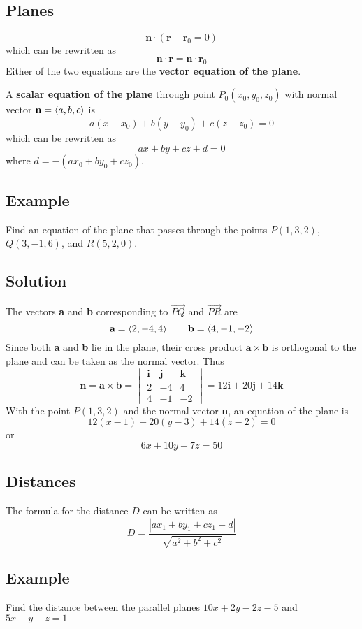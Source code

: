 \subsection*{Planes}

$$\textbf{n}\cdot (\textbf{r}-\textbf{r}_0=0)$$
which can be rewritten as
$$\mathbf{n\cdot r}=\textbf{n}\cdot \textbf{r}_0$$
Either of the two equations are the \textbf{vector equation of the plane}.

A \textbf{scalar equation of the plane} through point $P_0(x_0,y_0,z_0)$ with normal
vector $\textbf{n}=\ev{a,b,c}$ is
$$a(x-x_0)+b(y-y_0)+c(z-z_0)=0$$
which can be rewritten as
$$ax+by+cz+d=0$$
where $d=-(ax_0+by_0+cz_0)$.

\subsection*{Example}
Find an equation of the plane that passes through the points $P(1,3,2)$, \newline
$Q(3,-1,6)$, and $R(5,2,0)$.

\subsection*{Solution}
The vectors \textbf{a} and \textbf{b} corresponding to $\overrightarrow{PQ}$ and
$\overrightarrow{PR}$ are
$$\textbf{a}=\ev{2,-4,4} \qquad \textbf{b}=\ev{4,-1,-2}$$
Since both \textbf{a} and \textbf{b} lie in the plane, their cross product $\mathbf{a\times b}$
is orthogonal to the plane and can be taken as the normal vector. Thus
$$\mathbf{n=a\times b}=\begin{vmatrix}
        \textbf{i} & \textbf{j} & \textbf{k} \\
        2          & -4         & 4          \\
        4          & -1         & -2
    \end{vmatrix}=12\textbf{i}+20\textbf{j}+14\textbf{k}$$
With the point $P(1,3,2)$ and the normal vector \textbf{n}, an equation of the plane is
$$12(x-1)+20(y-3)+14(z-2)=0$$
or
$$6x+10y+7z=50$$

\subsection*{Distances}
The formula for the distance $D$ can be written as
$$D=\frac{|ax_1+by_1+cz_1+d|}{\sqrt{a^2+b^2+c^2}}$$

\subsection*{Example}
Find the distance between the parallel planes $10x+2y-2z-5$ and $5x+y-z=1$


